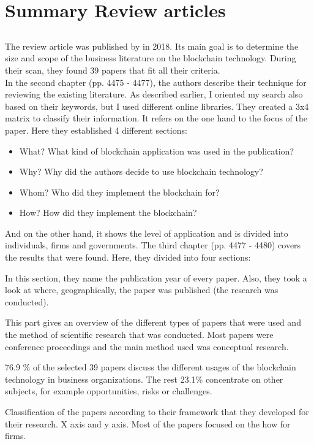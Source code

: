 \section*{Summary Review articles}
\subsection*{\citet{2018_Li}}
The review article was published by \citet{2018_Li} in 2018. Its main goal is to determine the size and scope of the business literature on the blockchain technology. During their scan, they found 39 papers that fit all their criteria.\\ In the second chapter (pp. 4475 - 4477), the authors describe their technique for reviewing the existing literature. As described earlier, I oriented my search also based on their keywords, but I used different online libraries. They created a 3x4 matrix to classify their information. It refers on the one hand to the focus of the paper. Here they established 4 different sections: 
\begin{itemize}[noitemsep]
	\item What? What kind of blockchain application was used in the publication?
	\item Why? Why did the authors decide to use blockchain technology?
	\item Whom? Who did they implement the blockchain for?
	\item How? How did they implement the blockchain?
\end{itemize}
And on the other hand, it shows the level of application and is divided into individuals, firms and governments.
The third chapter (pp. 4477 - 4480) covers the results that were found. Here, they divided into four sections:
\begin{description}[align=left]
	\item [Publication year and geographic distribution] In this section, they name the publication year of every paper. Also, they took a look at where, geographically, the paper was published (the research was conducted).
	\item [Publication type and nature of studies] This part gives an overview of the different types of papers that were used and the method of scientific research that was conducted. Most papers were conference proceedings and the main method used was conceptual research.
	\item [Main applications of blockchain in business organizations] 76.9 \% of the selected 39 papers discuss the different usages of the blockchain technology in business organizations. The rest 23.1\% concentrate on other subjects, for example opportunities, risks or challenges.
	\item [Focus of inquiry and level of analysis] Classification of the papers according to their framework that they developed for their research. X axis and y axis. Most of the papers focused on the how for firms.
\end{description} 
